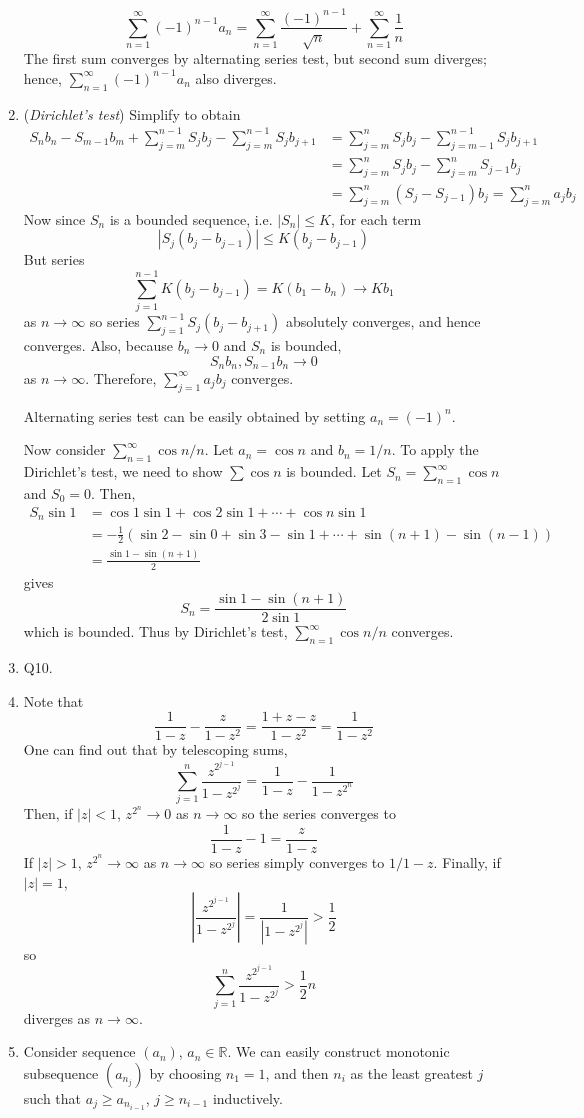 \documentclass[10pt, a4paper, twoside]{report}
\begin{document}
\begin{enumerate}[{1.}]
    \[\sum_{n=1}^{\infty}(-1)^{n-1}a_n=\sum_{n=1}^{\infty}\frac{(-1)^{n-1}}{\sqrt{n}}+\sum_{n=1}^{\infty}\frac 1n\]
    The first sum converges by alternating series test, but second sum diverges; \newline hence, \(\sum_{n=1}^{\infty}(-1)^{n-1}a_n\) also diverges.
    \item (\emph{Dirichlet's test}) Simplify to obtain 
    \begin{align*}
        S_nb_n-S_{m-1}b_m+\sum_{j=m}^{n-1}S_jb_j-\sum_{j=m}^{n-1}S_jb_{j+1}&=\sum_{j=m}^nS_jb_j-\sum_{j=m-1}^{n-1}S_jb_{j+1} \\
        &=\sum_{j=m}^nS_jb_j-\sum_{j=m}^nS_{j-1}b_j \\
        &=\sum_{j=m}^n(S_j-S_{j-1})b_j=\sum_{j=m}^na_jb_j
    \end{align*}
    Now since \(S_n\) is a bounded sequence, i.e. \(|S_n|\leq K\), for each term
    \[\left|S_j(b_j-b_{j-1})\right|\leq K(b_j-b_{j-1})\]
    But series 
    \[\sum_{j=1}^{n-1}K(b_j-b_{j-1})=K(b_1-b_n)\to Kb_1\]
    as \(n\to\infty\) so series \(\sum_{j=1}^{n-1}S_j(b_j-b_{j+1})\) absolutely converges, and hence converges. Also, because \(b_n\to 0\) and \(S_n\) is bounded, \[S_nb_n,S_{n-1}b_n\to 0\] as \(n\to\infty\). Therefore, \(\sum_{j=1}^\infty a_jb_j\) converges.

    Alternating series test can be easily obtained by setting \(a_n=(-1)^n\).

    Now consider \(\sum_{n=1}^\infty\cos n/n\). Let \(a_n=\cos n\) and \(b_n=1/n\). To apply the Dirichlet's test, we need to show \(\sum\cos n\) is bounded. Let \(S_n=\sum_{n=1}^{\infty}\cos n\) and \(S_0=0\). Then,
    \begin{align*}
        S_n\sin 1&=\cos 1\sin 1+\cos 2\sin 1+\cdots+\cos n\sin 1 \\
        &=-\frac 12(\sin 2-\sin 0+\sin 3-\sin 1+\cdots+\sin(n+1)-\sin (n-1)) \\
        &=\frac{\sin 1-\sin(n+1)}{2}
    \end{align*}
    gives 
    \[S_n=\frac{\sin 1-\sin(n+1)}{2\sin 1}\]
    which is bounded. Thus by Dirichlet's test,  \(\sum_{n=1}^\infty\cos n/n\) converges.
    \item Q10.
    \item Note that 
    \[\frac{1}{1-z}-\frac{z}{1-z^2}=\frac{1+z-z}{1-z^2}=\frac{1}{1-z^2}\]
    One can find out that by telescoping sums, 
    \[\sum_{j=1}^n\frac{z^{2^{j-1}}}{1-z^{2^j}}=\frac{1}{1-z}-\frac{1}{1-z^{2^n}}\]
    Then, if \(|z|<1\), \(z^{2^n}\to 0\) as \(n\to\infty\) so the series converges to 
    \[\frac 1{1-z}-1=\frac{z}{1-z}\]
    If \(|z|>1\), \(z^{2^n}\to\infty\) as \(n\to\infty\) so series simply converges to \(1/1-z\). Finally, if \(|z|=1\), 
    \[\left|\frac{z^{2^{j-1}}}{1-z^{2^j}}\right|=\frac 1{|1-z^{2^j}|}>\frac 12\]
    so 
    \[\sum_{j=1}^n\frac{z^{2^{j-1}}}{1-z^{2^j}}>\frac 12n\]
    diverges as \(n\to\infty\).
    \item Consider sequence \((a_n)\), \(a_n\in\mathbb{R}\). We can easily construct monotonic subsequence \((a_{n_j})\) by choosing \(n_1=1\), and then \(n_i\) as the least greatest \(j\) such that \(a_j\geq a_{n_{i-1}}\), \(j\geq n_{i-1}\) inductively.
    

\end{enumerate}
\end{document}
